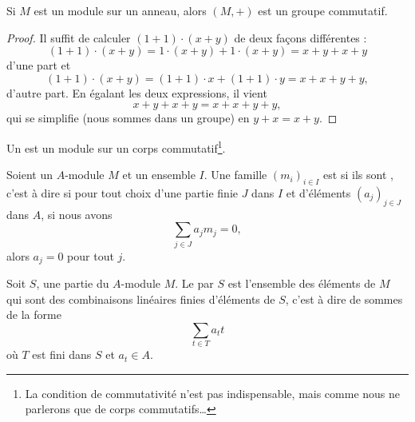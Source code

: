 \begin{proposition}\label{PROPooGARGooDiMqtN}
    Si \( M\) est un module sur un anneau, alors \( (M,+)\) est un groupe commutatif.
\end{proposition}

\begin{proof}
    Il suffit de calculer \( (1+1)\cdot (x+y)\) de deux façons différentes :
    \begin{equation}
        (1+1)\cdot (x+y)=1\cdot (x+y)+1\cdot (x+y)=x+y+x+y
    \end{equation}
    d'une part et
    \begin{equation}
        (1+1)\cdot (x+y)=(1+1)\cdot x+(1+1)\cdot y=x+x+y+y,
    \end{equation}
    d'autre part. En égalant les deux expressions, il vient
    \begin{equation}
        x+y+x+y=x+x+y+y,
    \end{equation}
    qui se simplifie (nous sommes dans un groupe) en \( y+x=x+y\).
\end{proof}

\begin{definition}\label{DEFooKHWZooIfxdNc}
    Un  est un module sur un corps commutatif\footnote{La condition de commutativité n'est pas indispensable, mais comme nous ne parlerons que de corps commutatifs\ldots}.
\end{definition}

\begin{definition}        \label{DEFooRUKVooLnXxdS}
    Soient un \( A\)-module \( M\) et un ensemble \( I\). Une famille \( (m_i)_{i\in I}\) est  si ils sont , c'est à dire si pour tout choix d'une partie finie \( J\) dans \( I\) et d'éléments \( (a_j)_{j\in J}\) dans \( A\), si nous avons
    \begin{equation}
        \sum_{j\in J}a_jm_j=0,
    \end{equation}
    alors \( a_j=0\) pour tout \( j\).
\end{definition}

\begin{definition}        \label{DEFooWBOBooJNyyBF}
    Soit \( S\), une partie du \( A\)-module \( M\). Le  par \( S\) est l'ensemble des éléments de \( M\) qui sont des combinaisons linéaires finies d'éléments de \( S\), c'est à dire de sommes de la forme
    \begin{equation}
        \sum_{t\in T}a_tt
    \end{equation}
    où \( T\) est fini dans \( S\) et \( a_t\in A\).
\end{definition}

